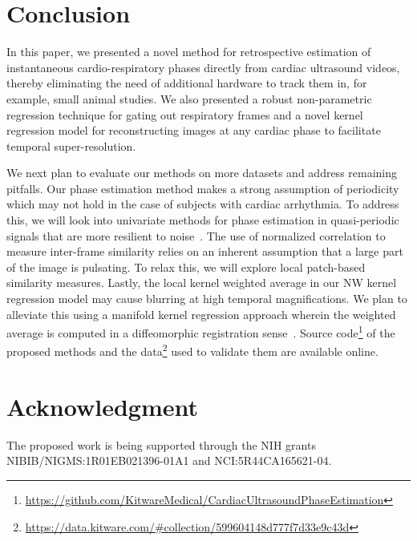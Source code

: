 \documentclass[journal]{IEEEtran}
\begin{document}
\section{Conclusion}
\label{sec:conclusion}
%
In this paper, we presented a novel method for retrospective estimation of instantaneous cardio-respiratory phases directly from cardiac ultrasound videos, thereby eliminating the need of additional hardware to track them in, for example, small animal studies. We also presented a robust non-parametric regression technique for gating out respiratory frames and a novel kernel regression model for reconstructing images at any cardiac phase to facilitate temporal super-resolution.

We next plan to evaluate our methods on more datasets and address remaining pitfalls. Our phase estimation method makes a strong assumption of periodicity which may not hold in the case of subjects with cardiac arrhythmia. To address this, we will look into univariate methods for phase estimation in quasi-periodic signals that are more resilient to noise~\cite{Luo2003,Lu2013,Kurz2015}. The use of normalized correlation to measure inter-frame similarity relies on an inherent assumption that a large part of the image is pulsating. To relax this, we will explore local patch-based similarity measures. Lastly, the local kernel weighted average in our NW kernel regression model may cause blurring at high temporal magnifications. We plan to alleviate this using a manifold kernel regression approach wherein the weighted average is computed in a diffeomorphic registration sense~\cite{Davis2010}. Source code\footnote{\url{https://github.com/KitwareMedical/CardiacUltrasoundPhaseEstimation}} of the proposed methods and the data\footnote{\url{https://data.kitware.com/\#collection/599604148d777f7d33e9c43d}} used to validate them are available online.
%
\vspace{-0.3cm}
\section*{Acknowledgment}
The proposed work is being supported through the NIH grants NIBIB/NIGMS:1R01EB021396-01A1 and NCI:5R44CA165621-04. 
%
\vspace{-0.3cm}


%
\end{document}
